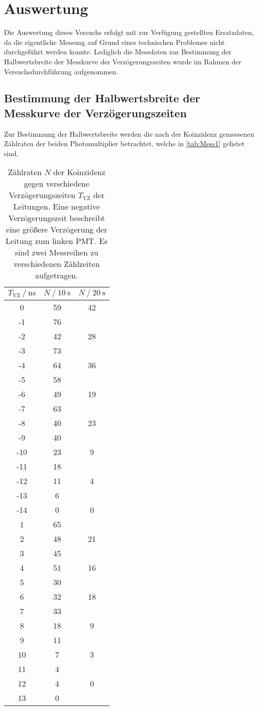 \section{Auswertung}
\label{sec:Auswertung}
Die Auswertung dieses Versuchs erfolgt mit zur Verfügung gestellten Ersatzdaten, da die eigentliche Messung auf Grund eines technischen Problemes 
nicht durchgeführt werden konnte. Lediglich die Messdaten zur Bestimmung der Halbwertsbreite der Messkurve der Verzögerungszeiten wurde im Rahmen der Versuchsdurchführung aufgenommen.

\subsection{Bestimmung der Halbwertsbreite der Messkurve der Verzögerungszeiten}
Zur Bestimmung der Halbwertsbreite werden die nach der Koinzidenz gemessenen Zählraten der beiden Photomultiplier betrachtet, welche in \autoref{tab:Mess1} gelistet sind. 
\begin{table}
  \tiny
  \centering
  \caption{Zählraten $N$ der Koinzidenz gegen verschiedene Verzögerungszeiten $T_\text{VZ}$ der Leitungen. Eine negative Verzögerungszeit beschreibt eine größere Verzögerung der Leitung zum linken PMT.
  Es sind zwei Messreihen zu verschiedenen Zählzeiten aufgetragen.}
  \label{tab:Mess1}
  \begin{tabular}{c c c}
    \toprule
    {$ T_\text{VZ} \mathbin{/} \unit{\nano\second}$} & {$N \mathbin{/} \qty{10}{\second}$} & {$N \mathbin{/} \qty{20}{\second}$} \\
    \midrule
     0 & 59 & 42 \\
    -1 & 76 &  \\
    -2 & 42 & 28 \\
    -3 & 73 &  \\
    -4 & 64 & 36 \\
    -5 & 58 &  \\
    -6 & 49 & 19 \\
    -7 & 63 &  \\
    -8 & 40 & 23 \\
    -9 & 40 &  \\
   -10 & 23 & 9 \\
   -11 & 18 &  \\
   -12 & 11 & 4 \\
   -13 &  6 &  \\
   -14 &  0 & 0 \\
     1 & 65 &  \\
     2 & 48 & 21 \\
     3 & 45 &  \\
     4 & 51 & 16 \\
     5 & 30 &  \\
     6 & 32 & 18 \\
     7 & 33 &  \\
     8 & 18 & 9 \\
     9 & 11 &  \\
    10 &  7 & 3 \\
    11 &  4 &  \\
    12 &  4 & 0 \\
    13 &  0 &  \\
    \bottomrule
  \end{tabular}
\end{table}
